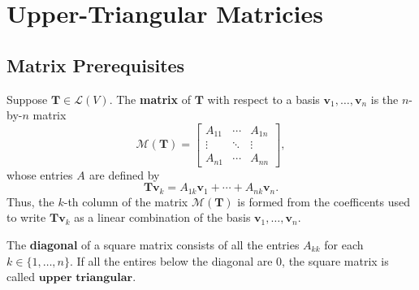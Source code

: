 \documentclass[11pt]{article}
\renewcommand{\vec}[1]{\mathbf{#1}}
\newcommand{\mat}[1]{\mathbf{#1}}
\begin{document}

\section{Upper-Triangular Matricies}


\subsection{Matrix Prerequisites}

Suppose $\mat{T} \in \mathcal{L}(V)$. The \textbf{matrix} of $\mat{T}$ with respect to a basis $\vec{v}_{1}, \ldots, \vec{v}_{n}$ is the $n$-by-$n$ matrix 
\[
	\mathcal{M}(\mat{T}) = \begin{bmatrix} A_{11} & \cdots & A_{1n} \\ \vdots & \ddots & \vdots \\ A_{n1} & \cdots & A_{nn} \end{bmatrix},
\]
whose entries $A_{}$ are defined by
\[
	\mat{T} \vec{v}_{k} = A_{1k} \vec{v}_{1} + \cdots + A_{nk} \vec{v}_{n}.
\]
Thus, the $k$-th column of the matrix $\mathcal{M}(\mat{T})$ is formed from the coefficents used to write $\mat{T} \vec{v}_{k}$ as a linear combination of the basis $\vec{v}_{1}, \ldots, \vec{v}_{n}$.

The \textbf{diagonal} of a square matrix consists of all the entries $A_{kk}$ for each $k \in \{ 1, \ldots, n \}$. If all the entires below the diagonal are $0$, the square matrix is called $\textbf{upper triangular}$.
\end{document}
